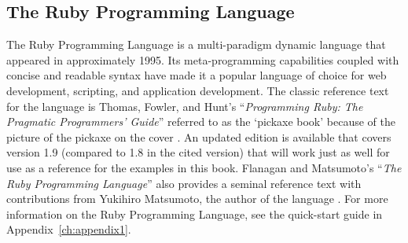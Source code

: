 \begin{bibunit}
% 
% 
\subsection{The Ruby Programming Language}
The Ruby Programming Language is a multi-paradigm dynamic language that appeared in approximately 1995. Its meta-programming capabilities coupled with concise and readable syntax have made it a popular language of choice for web development, scripting, and application development. The classic reference text for the language is Thomas, Fowler, and Hunt's ``\emph{Programming Ruby: The Pragmatic Programmers' Guide}'' referred to as the `pickaxe book' because of the picture of the pickaxe on the cover \cite{Thomas2004}. An updated edition is available that covers version 1.9 (compared to 1.8 in the cited version) that will work just as well for use as a reference for the examples in this book. Flanagan and Matsumoto's ``\emph{The Ruby Programming Language}'' also provides a seminal reference text with contributions from Yukihiro Matsumoto, the author of the language \cite{Flanagan2008}. For more information on the Ruby Programming Language, see the quick-start guide in Appendix~\ref{ch:appendix1}.


\renewcommand{\bibsection}{\section{\bibname}}
\putbib
\end{bibunit}

